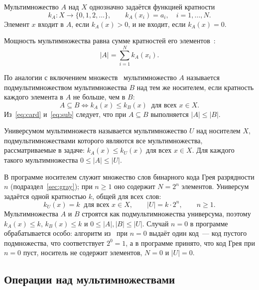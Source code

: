 \documentclass[14pt,a4paper]{extarticle}
\newcommand{\kA}{k_A(x)}
\newcommand{\kB}{k_B(x)}
\newcommand{\kU}{k_U(x)}
\begin{document}
Мультимножество $A$ над $X$ однозначно задаётся функцией кратности
\begin{equation}\label{eq:kfun}
k_A \colon X \to \{0, 1, 2, \ldots\}, \qquad k_A(x_i) = a_i, \quad i = 1, \ldots, N.
\end{equation}
Элемент $x$ входит в $A$, если $\kA > 0$, и не входит, если $\kA = 0$.

Мощность мультимножества равна сумме кратностей его элементов~\cite{novikov}:
\begin{equation}\label{eq:card}
|A| = \sum_{i=1}^{N} k_A(x_i).
\end{equation}

По аналогии с включением множеств~\cite{novikov} мультимножество $A$ называется подмультимножеством мультимножества $B$ над тем же носителем, если кратность каждого элемента в $A$ не больше, чем в $B$:
\begin{equation}\label{eq:sub}
A \subseteq B \iff \kA \leqslant \kB \;\; \text{для всех } x \in X.
\end{equation}
Из~\eqref{eq:card} и~\eqref{eq:sub} следует, что при $A \subseteq B$ выполняется $|A| \leqslant |B|$.

Универсумом мультимножеств называется мультимножество $U$ над носителем $X$, подмультимножествами которого являются все мультимножества, рассматриваемые в задаче: $\kA \leqslant \kU$ для всех $x \in X$. Для каждого такого мультимножества $0 \leqslant |A| \leqslant |U|$.

В программе носителем служит множество слов бинарного кода Грея разрядности $n$ (подраздел~\ref{sec:gray}); при $n \geqslant 1$ оно содержит $N = 2^n$ элементов. Универсум задаётся одной кратностью $k$, общей для всех слов:
\begin{equation}\label{eq:univ}
\kU = k \;\; \text{для всех } x \in X, \qquad |U| = k \cdot 2^n, \qquad n \geqslant 1.
\end{equation}
Мультимножества $A$ и $B$ строятся как подмультимножества универсума, поэтому $\kA \leqslant k$, $\kB \leqslant k$ и $0 \leqslant |A|, |B| \leqslant |U|$. Случай $n = 0$ в программе обрабатывается особо: алгоритм из~\cite{novikov} при $n = 0$ выдаёт один код~--- код пустого подмножества, что соответствует $2^0 = 1$, а в программе принято, что код Грея при $n = 0$ пуст, носитель не содержит элементов, $N = 0$ и $|U| = 0$.

\subsection{Операции над мультимножествами}\label{sec:ops}
\end{document}
